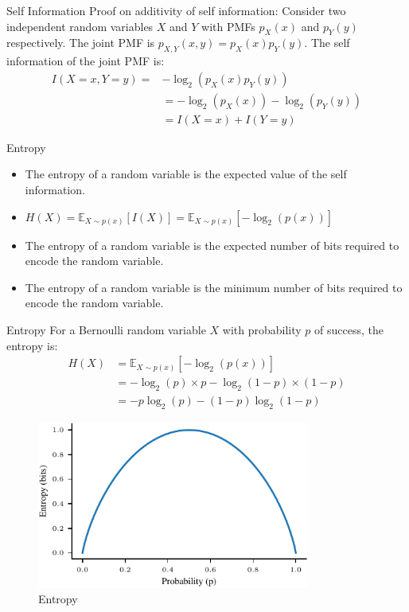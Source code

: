 \documentclass[handout]{beamer}
\begin{document}
\begin{frame}{Self Information}
    Proof on additivity of self information:
    Consider two independent random variables $X$ and $Y$ with PMFs $p_X(x)$ and $p_Y(y)$ respectively. The joint PMF is $p_{X, Y}(x, y) = p_X(x)p_Y(y)$. The self information of the joint PMF is:
    \begin{align*}
        I(X=x, Y=y)=& -\log_2(p_X(x)p_Y(y)) \\
        &= -\log_2(p_X(x)) - \log_2(p_Y(y))\\ &= I(X=x) + I(Y=y)
    \end{align*}
    
\end{frame}

\begin{frame}{Entropy}
    \begin{itemize}
        \item The entropy of a random variable is the expected value of the self information.
        \item $H(X) = \mathbb{E}_{X \sim p(x)}[I(X)] = \mathbb{E}_{X \sim p(x)}[-\log_2(p(x))]$
        \item The entropy of a random variable is the expected number of bits required to encode the random variable.
        \item The entropy of a random variable is the minimum number of bits required to encode the random variable.
    \end{itemize}
    
\end{frame}

\begin{frame}{Entropy}
    For a Bernoulli random variable $X$ with probability $p$ of success, the entropy is:
    \begin{align*}
        H(X) &= \mathbb{E}_{X \sim p(x)}[-\log_2(p(x))] \\
        &= -\log_2(p) \times p - \log_2(1-p) \times (1-p) \\
        &= -p\log_2(p) - (1-p)\log_2(1-p)
    \end{align*}
    \begin{figure}
        \centering
        \includegraphics[width=0.8\textwidth]{notebooks/figures/information-theory/entropy-bernoulli.pdf}
        \caption{Entropy}
        \label{fig:entropy}
    \end{figure}
    
\end{frame}
\end{document}
